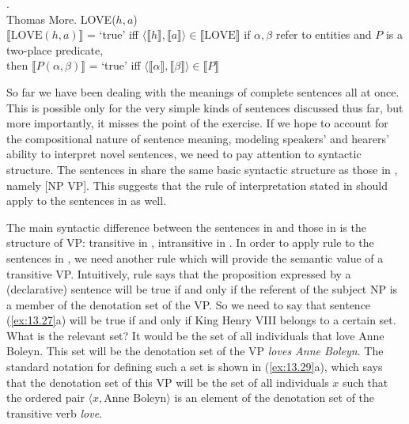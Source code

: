 \ea \label{ex:13.27}
.\\
  {Thomas More}.
                       \z
\ex \label{ex:13.28}
\ea  LOVE($h,a$)\\
\ex  $\llbracket\text{LOVE}(h,a)\rrbracket$  = ‘true’  
    iff  
    $\langle\llbracket h\rrbracket,\llbracket a\rrbracket \rangle \in \llbracket\text{LOVE}\rrbracket$ 
\ex  if $\alpha, \beta$ refer to entities and $P$ is a two-place predicate,\\
  then  $\llbracket P(\alpha,\beta)\rrbracket$  = ‘true’  
  iff  
  $\langle\llbracket \alpha\rrbracket,\llbracket \beta\rrbracket \rangle \in \llbracket P\rrbracket$ 
\z \z


So far we have been dealing with the meanings of complete sentences all at once. This is possible only for the very simple kinds of sentences discussed thus far, but more importantly, it misses the point of the exercise. If we hope to account for the compositional nature of sentence meaning, modeling speakers’ and hearers’ ability to interpret novel sentences, we need to pay attention to syntactic structure. The sentences in  share the same basic syntactic structure as those in , namely [NP VP]. This suggests that the rule of interpretation stated in  should apply to the sentences in  as well.



The main syntactic difference between the sentences in  and those in  is the structure of VP: transitive in , intransitive in . In order to apply rule  to the sentences in , we need another rule which will provide the semantic value of a transitive VP. Intuitively, rule  says that the proposition expressed by a (declarative) sentence will be true if and only if the referent of the subject NP is a member of the denotation set of the VP. So we need to say that sentence (\ref{ex:13.27}a) will be true if and only if King Henry VIII belongs to a certain set. What is the relevant set? It would be the set of all individuals that love Anne Boleyn. This set will be the denotation set of the VP \textit{loves Anne Boleyn}. The standard notation for defining such a set is shown in (\ref{ex:13.29}a), which says that the denotation set of this VP will be the set of all individuals $x$ such that the ordered pair $\langle x, \text{Anne Boleyn}\rangle$ is an element of the denotation set of the transitive verb \textit{love}.


